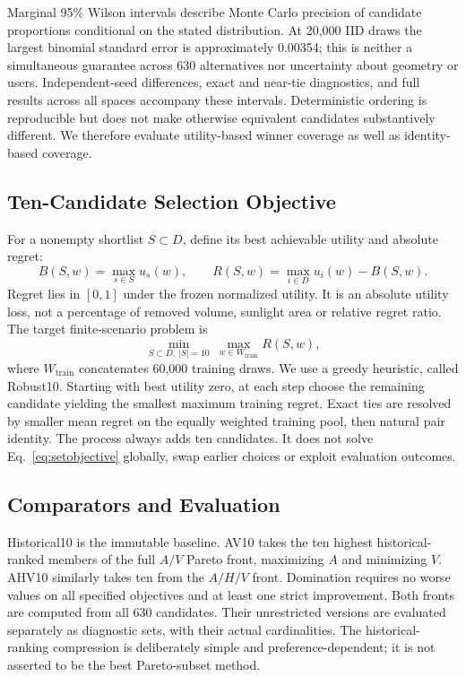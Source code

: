 \documentclass{llncs}
\begin{document}
Marginal 95\% Wilson intervals describe Monte Carlo precision of candidate proportions conditional on the stated distribution. At 20,000 IID draws the largest binomial standard error is approximately 0.00354; this is neither a simultaneous guarantee across 630 alternatives nor uncertainty about geometry or users. Independent-seed differences, exact and near-tie diagnostics, and full results across all spaces accompany these intervals. Deterministic ordering is reproducible but does not make otherwise equivalent candidates substantively different. We therefore evaluate utility-based winner coverage as well as identity-based coverage.

\subsection{Ten-Candidate Selection Objective}
For a nonempty shortlist $S\subset D$, define its best achievable utility and absolute regret:
\begin{equation}
 B(S,w)=\max_{s\in S}u_s(w),\qquad R(S,w)=\max_{i\in D}u_i(w)-B(S,w).
\label{eq:regret}
\end{equation}
Regret lies in $[0,1]$ under the frozen normalized utility. It is an absolute utility loss, not a percentage of removed volume, sunlight area or relative regret ratio. The target finite-scenario problem is
\begin{equation}
 \min_{S\subset D,\ |S|=10}\ \max_{w\in W_{\mathrm{train}}}R(S,w),
\label{eq:setobjective}
\end{equation}
where $W_{\mathrm{train}}$ concatenates 60,000 training draws. We use a greedy heuristic, called Robust10. Starting with best utility zero, at each step choose the remaining candidate yielding the smallest maximum training regret. Exact ties are resolved by smaller mean regret on the equally weighted training pool, then natural pair identity. The process always adds ten candidates. It does not solve Eq.~\ref{eq:setobjective} globally, swap earlier choices or exploit evaluation outcomes.

\subsection{Comparators and Evaluation}
Historical10 is the immutable baseline. AV10 takes the ten highest historical-ranked members of the full $A/V$ Pareto front, maximizing $A$ and minimizing $V$. AHV10 similarly takes ten from the $A/H/V$ front. Domination requires no worse values on all specified objectives and at least one strict improvement. Both fronts are computed from all 630 candidates. Their unrestricted versions are evaluated separately as diagnostic sets, with their actual cardinalities. The historical-ranking compression is deliberately simple and preference-dependent; it is not asserted to be the best Pareto-subset method.
\end{document}
